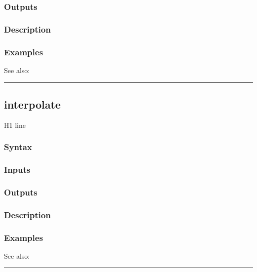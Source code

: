 \documentclass[letterpaper,10pt,english]{sphinxmanual}
\begin{document}
\subsubsection{Outputs}
\label{classes/time_series/@ts/ts:id275}

\subsubsection{Description}
\label{classes/time_series/@ts/ts:id276}

\subsubsection{Examples}
\label{classes/time_series/@ts/ts:id277}
See also:


\bigskip\hrule{}\bigskip



\subsection{interpolate}
\label{classes/time_series/@ts/ts:id278}\label{classes/time_series/@ts/ts:interpolate}
H1 line


\subsubsection{Syntax}
\label{classes/time_series/@ts/ts:id279}

\subsubsection{Inputs}
\label{classes/time_series/@ts/ts:id280}

\subsubsection{Outputs}
\label{classes/time_series/@ts/ts:id281}

\subsubsection{Description}
\label{classes/time_series/@ts/ts:id282}

\subsubsection{Examples}
\label{classes/time_series/@ts/ts:id283}
See also:


\bigskip\hrule{}\bigskip
\end{document}
